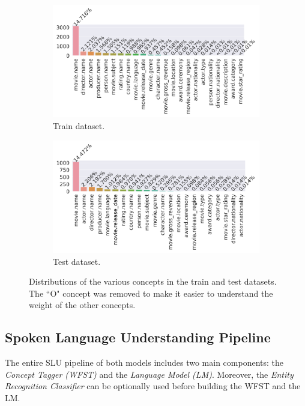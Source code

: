 \documentclass[11pt,a4paper]{article}
\begin{document}
\begin{figure}
	\begin{subfigure}[b]{0.5\linewidth}
		\includegraphics[width=\linewidth]{img/train-concepts-distribution}
		\caption{Train dataset.}
	\end{subfigure}
	\begin{subfigure}[b]{0.5\linewidth}
	\includegraphics[width=\textwidth]{img/test-concepts-distribution}
	\caption{Test dataset.}
	\end{subfigure}
	\caption{Distributions of the various concepts in the train and test datasets. The ``O" concept was removed to make it easier to understand the weight of the other concepts.}
	\label{fig:concept-distribution}
\end{figure}

\subsection{Spoken Language Understanding Pipeline}

The entire SLU pipeline of both models includes two main components: the \textit{Concept Tagger (WFST)} and the \textit{Language Model (LM)}. Moreover, the \textit{Entity Recognition Classifier} can be optionally used before building the WFST and the LM. 
\end{document}
